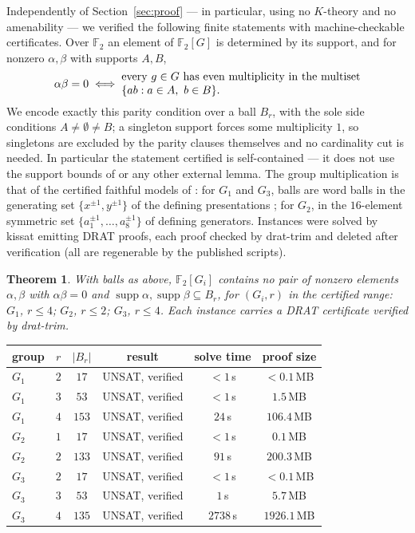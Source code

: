 \documentclass[11pt]{amsart}
\newtheorem{theorem}{Theorem}[section]
\theoremstyle{definition}
\newcommand{\Ball}[1]{B_{#1}}
\newcommand{\GOne}{G_1}
\newcommand{\GTwo}{G_2}
\newcommand{\GThree}{G_3}
\newcommand{\F}{\mathbb{F}}
\begin{document}
Independently of Section~\ref{sec:proof} --- in particular, using no
$K$-theory and no amenability --- we verified the following finite
statements with machine-checkable certificates. Over $\F_2$ an element of
$\F_2[G]$ is determined by its support, and for nonzero $\alpha,\beta$ with
supports $A,B$,
\[
\alpha\beta=0 \iff
\begin{minipage}[c]{0.62\linewidth}
every $g\in G$ has even multiplicity in the multiset
$\{ab : a\in A,\ b\in B\}$.
\end{minipage}
\]
We encode exactly this parity condition over a ball $\Ball{r}$, with the
sole side conditions $A\ne\emptyset\ne B$; a singleton support forces some
multiplicity $1$, so singletons are excluded by the parity clauses
themselves and no cardinality cut is needed. In particular the statement
certified is self-contained --- it does not use the support bounds of
\cite[Theorem 1.4]{NS} or any other external lemma. The group
multiplication is that of the certified faithful models of
\cite{companion,companionP}: for $\GOne$ and $\GThree$, balls are word
balls in the generating set $\{x^{\pm1},y^{\pm1}\}$ of the defining
presentations \cite[(3.1), \S4]{NS}; for $\GTwo$, in the $16$-element
symmetric set $\{a_1^{\pm1},\dots,a_8^{\pm1}\}$ of defining generators.
Instances were solved by \textsf{kissat} emitting DRAT proofs, each proof
checked by \textsf{drat-trim} \cite{dratTrim} and deleted after
verification (all are regenerable by the published scripts).

\begin{theorem}\label{thm:balls}
With balls as above, $\F_2[G_i]$ contains no pair of nonzero elements
$\alpha,\beta$ with $\alpha\beta=0$ and
$\operatorname{supp}\alpha,\operatorname{supp}\beta\subseteq\Ball{r}$, for
$(G_i,r)$ in the certified range: $\GOne$, $r\le4$; $\GTwo$, $r\le2$;
$\GThree$, $r\le4$. Each instance carries a DRAT certificate verified by
\textsf{drat-trim}.
\end{theorem}

\begin{center}
\begin{tabular}{lccccc}
\toprule
group & $r$ & $|\Ball{r}|$ & result & solve time & proof size\\
\midrule
$\GOne$ & $2$ & $17$ & UNSAT, verified & $<1$\,s & $<0.1$\,MB\\
$\GOne$ & $3$ & $53$ & UNSAT, verified & $<1$\,s & $1.5$\,MB\\
$\GOne$ & $4$ & $153$ & UNSAT, verified & $24$\,s & $106.4$\,MB\\
$\GTwo$ & $1$ & $17$ & UNSAT, verified & $<1$\,s & $0.1$\,MB\\
$\GTwo$ & $2$ & $133$ & UNSAT, verified & $91$\,s & $200.3$\,MB\\
$\GThree$ & $2$ & $17$ & UNSAT, verified & $<1$\,s & $<0.1$\,MB\\
$\GThree$ & $3$ & $53$ & UNSAT, verified & $1$\,s & $5.7$\,MB\\
$\GThree$ & $4$ & $135$ & UNSAT, verified & $2738$\,s & $1926.1$\,MB\\
\bottomrule
\end{tabular}
\end{center}
\end{document}
